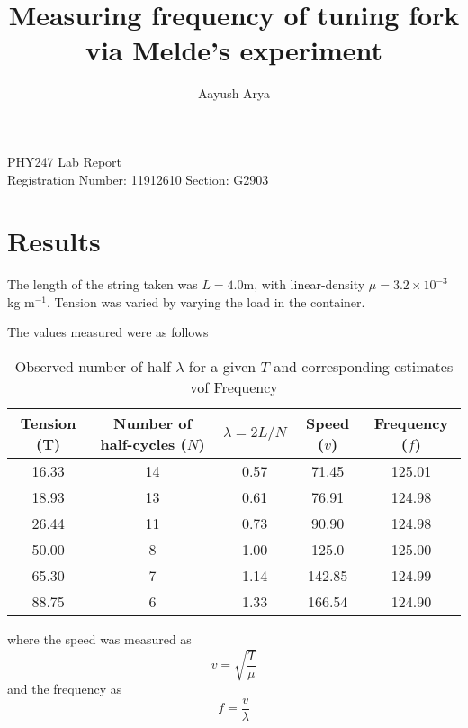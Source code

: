 \documentclass[11pt, a4paper]{article}
\begin{document}
	\author{Aayush Arya}
	\title{Measuring frequency of tuning fork via Melde's experiment}
	\maketitle
	
	\hline
	\begin{center}
		PHY247 Lab Report\\
		Registration Number: 11912610 \quad Section: G2903
	\end{center}
	\hline
	
	\section*{Results}
	
	The length of the string taken was $L = 4.0$m, with linear-density $\mu = 3.2 \times 10^{-3}$ kg m$^{-1}$. Tension was varied by varying the load in the container.
	
	The values measured were as follows
	
	\begin{table}[h]
		\centering
		\begin{tabular}{|c|c|c|c|c|}
			\hline
			Tension (T) & Number of half-cycles ($N$) & $\lambda = 2L/N$ & Speed ($v$) & Frequency ($f$)\\
			\hline
			16.33 & 14 & 0.57 & 71.45& 125.01\\
			18.93 & 13 &  0.61 & 76.91& 124.98\\
			26.44 & 11 & 0.73 & 90.90 & 124.98\\
			50.00 & 8 & 1.00 & 125.0  & 125.00\\
			65.30 &	7 & 1.14 & 142.85 & 124.99\\
			88.75 & 6 & 1.33 & 166.54 & 124.90\\
			\hline
		\end{tabular}
		\caption{Observed number of half-$\lambda$ for a given $T$ and corresponding estimates vof Frequency}
	\end{table}
	
	where the speed was measured as $$ v = \sqrt{\frac{T}{\mu}}$$
	and the frequency as $$ f = \frac{v}{\lambda}$$
	
	
\end{document}
